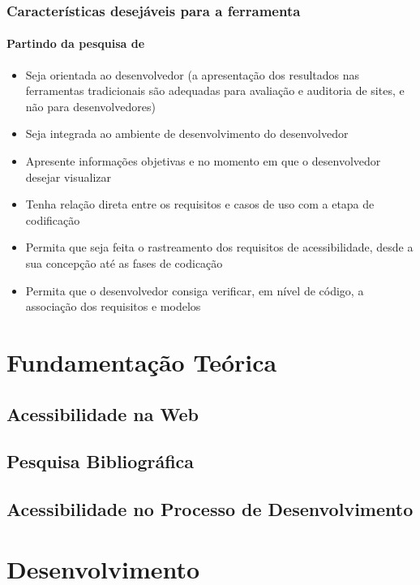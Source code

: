 \documentclass{beamer}
\begin{document}
\begin{frame}[allowframebreaks]
\frametitle{Características desejáveis para a ferramenta}
\framesubtitle{Partindo da pesquisa de \citet{Trewin:2010:ACT:1805986.1806029}}

\begin{itemize}
 \item Seja orientada ao desenvolvedor (a apresentação dos resultados nas ferramentas tradicionais são adequadas para avaliação e auditoria de sites, e não para desenvolvedores)
 \item Seja integrada ao ambiente de desenvolvimento do desenvolvedor
 \item Apresente informações objetivas e no momento em que o desenvolvedor desejar visualizar
 \item Tenha relação direta entre os requisitos e casos de uso com a etapa de codificação
 \item Permita que seja feita o rastreamento dos requisitos de acessibilidade, desde a sua concepção até as fases de codicação
 \item Permita que o desenvolvedor consiga verificar, em nível de código, a associação dos requisitos e modelos
\end{itemize}

\end{frame}

\section{Fundamentação Teórica}
 
\subsection[Acessibilidade na Web]{Acessibilidade na Web}

\subsection[Pesquisa Bibliográfica]{Pesquisa Bibliográfica}

\subsection[MTA]{Acessibilidade no Processo de Desenvolvimento}

\section{Desenvolvimento}
\end{document}
